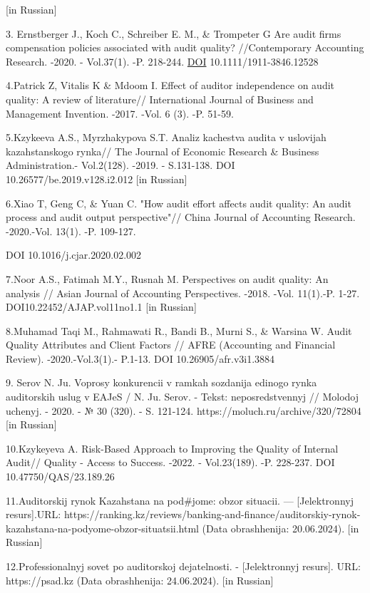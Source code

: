 {[}in Russian{]}

3. Ernstberger J., Koch C., Schreiber E. M., \& Trompeter G Are audit
firms\textquotesingle{} compensation policies associated with audit
quality? //Contemporary Accounting Research. -2020. - Vol.37(1). -P.
218-244. \href{https://DOI/}{DOI} 10.1111/1911-3846.12528

4.Patrick Z, Vitalis K \& Mdoom I. Effect of auditor independence on
audit quality: A review of literature// International Journal of
Business and Management Invention. -2017. -Vol. 6 (3). -P. 51-59.

5.Kzykeeva A.S., Myrzhakypova S.T. Analiz kachestva audita v uslovijah
kazahstanskogo rynka// The Journal of Economic Research \& Business
Administration.- Vol.2(128). -2019. - S.131-138. DOI
10.26577/be.2019.v128.i2.012 {[}in Russian{]}

6.Xiao T, Geng C, \& Yuan C. "How audit effort affects audit quality: An
audit process and audit output perspective"// China Journal of
Accounting Research. -2020.-Vol. 13(1). -P. 109-127.

DOI 10.1016/j.cjar.2020.02.002

7.Noor A.S., Fatimah M.Y., Rusnah M. Perspectives on audit quality: An
analysis // Asian Journal of Accounting Perspectives. -2018. -Vol.
11(1).-P. 1-27. DOI10.22452/AJAP.vol11no1.1 {[}in Russian{]}

8.Muhamad Taqi M., Rahmawati R., Bandi B., Murni S., \& Warsina W. Audit
Quality Attributes and Client Factors // AFRE (Accounting and Financial
Review). -2020.-Vol.3(1).- P.1-13. DOI 10.26905/afr.v3i1.3884

9. Serov N. Ju. Voprosy konkurencii v ramkah sozdanija edinogo rynka
auditorskih uslug v EAJeS / N. Ju. Serov. - Tekst: neposredstvennyj //
Molodoj uchenyj. - 2020. - № 30 (320). - S. 121-124.
https://moluch.ru/archive/320/72804 {[}in Russian{]}

10.Kzykeyeva A. Risk-Based Approach to Improving the Quality of Internal
Audit// Quality - Access to Success. -2022. - Vol.23(189). -P. 228-237.
DOI 10.47750/QAS/23.189.26

11.Auditorskij rynok Kazahstana na pod\#jome: obzor situacii. ---
{[}Jelektronnyj resurs{]}.URL:
https://ranking.kz/reviews/banking-and-finance/auditorskiy-rynok-kazahstana-na-podyome-obzor-situatsii.html
(Data obrashhenija: 20.06.2024). {[}in Russian{]}

12.Professional\textquotesingle nyj sovet po auditorskoj
dejatel\textquotesingle nosti. - {[}Jelektronnyj resurs{]}. URL:
https://psad.kz (Data obrashhenija: 24.06.2024). {[}in Russian{]}

